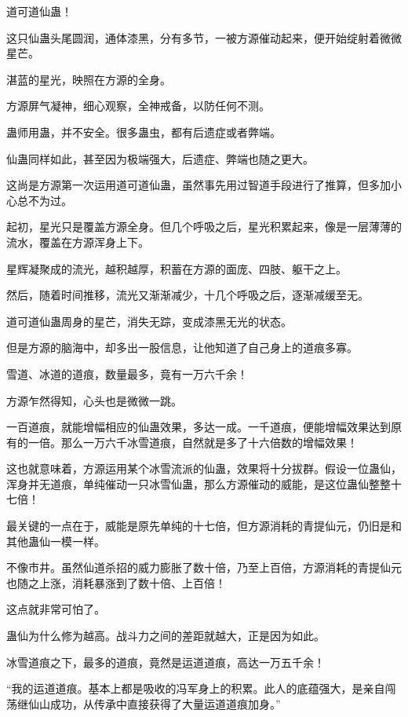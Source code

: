 
\begin{this_body}

道可道仙蛊！

这只仙蛊头尾圆润，通体漆黑，分有多节，一被方源催动起来，便开始绽射着微微星芒。

湛蓝的星光，映照在方源的全身。

方源屏气凝神，细心观察，全神戒备，以防任何不测。

蛊师用蛊，并不安全。很多蛊虫，都有后遗症或者弊端。

仙蛊同样如此，甚至因为极端强大，后遗症、弊端也随之更大。

这尚是方源第一次运用道可道仙蛊，虽然事先用过智道手段进行了推算，但多加小心总不为过。

起初，星光只是覆盖方源全身。但几个呼吸之后，星光积累起来，像是一层薄薄的流水，覆盖在方源浑身上下。

星辉凝聚成的流光，越积越厚，积蓄在方源的面庞、四肢、躯干之上。

然后，随着时间推移，流光又渐渐减少，十几个呼吸之后，逐渐减缓至无。

道可道仙蛊周身的星芒，消失无踪，变成漆黑无光的状态。

但是方源的脑海中，却多出一股信息，让他知道了自己身上的道痕多寡。

雪道、冰道的道痕，数量最多，竟有一万六千余！

方源乍然得知，心头也是微微一跳。

一百道痕，就能增幅相应的仙蛊效果，多达一成。一千道痕，便能增幅效果达到原有的一倍。那么一万六千冰雪道痕，自然就是多了十六倍数的增幅效果！

这也就意味着，方源运用某个冰雪流派的仙蛊，效果将十分拔群。假设一位蛊仙，浑身并无道痕，单纯催动一只冰雪仙蛊，那么方源催动的威能，是这位蛊仙整整十七倍！

最关键的一点在于，威能是原先单纯的十七倍，但方源消耗的青提仙元，仍旧是和其他蛊仙一模一样。

不像市井。虽然仙道杀招的威力膨胀了数十倍，乃至上百倍，方源消耗的青提仙元也随之上涨，消耗暴涨到了数十倍、上百倍！

这点就非常可怕了。

蛊仙为什么修为越高。战斗力之间的差距就越大，正是因为如此。

冰雪道痕之下，最多的道痕，竟然是运道道痕，高达一万五千余！

“我的运道道痕。基本上都是吸收的冯军身上的积累。此人的底蕴强大，是亲自闯荡继仙山成功，从传承中直接获得了大量运道道痕加身。”


\end{this_body}
